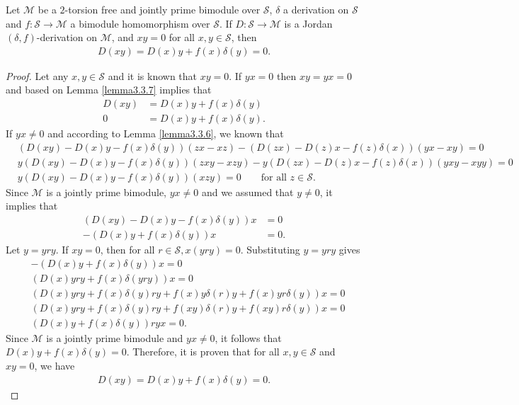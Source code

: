 \documentclass{arxiv}
\begin{document}
\begin{lemma}\label{lemma3.3.8}
    Let $\mathcal{M}$ be a $2$-torsion free and jointly prime bimodule over $\mathcal{S}$, $\delta$ a derivation on $\mathcal{S}$ and $f : \mathcal{S} \rightarrow \mathcal{M}$ a bimodule homomorphism over $\mathcal{S}$. If $D:\mathcal{S} \rightarrow \mathcal{M}$ is a Jordan $(\delta,f)$-derivation on $\mathcal{M}$, and $xy=0$ for all $x,y \in \mathcal{S}$, then
    \begin{align*}
        D(xy) = D(x)y + f(x)\delta (y)=0.
    \end{align*}
\end{lemma}
\begin{proof}
     Let any $x,y \in \mathcal{S}$ and it is known that $xy = 0$. If $yx = 0$ then $xy=yx = 0$ and based on Lemma \ref{lemma3.3.7} implies that 
     \begin{align*}
         D(xy) & =D(x)y + f(x)\delta (y)\\
        0 &= D(x)y + f(x)\delta (y).
     \end{align*}
     If $yx \ne 0$ and according to Lemma \ref{lemma3.3.6}, we known that
     \begin{align*}
         &(D(xy)-D(x)y-f(x)\delta(y))(zx-xz) - (D(zx)-D(z)x-f(z)\delta (x)) (yx-xy)=0\\
         &y(D(xy)-D(x)y-f(x)\delta (y))(zxy-xzy) - y(D(zx)-D(z)x-f(z)\delta (x))(yxy-xyy)=0\\
         &y(D(xy)-D(x)y-f(x)\delta(y))(xzy)=0 \quad \quad \text{for all } z \in \mathcal{S}.
     \end{align*}
     Since $\mathcal{M}$ is a jointly prime bimodule, $yx \ne 0$ and we assumed that $y \ne 0$, it implies that
     \begin{align*}
         (D(xy)-D(x)y-f(x)\delta (y))x &= 0\\
          -(D(x)y+f(x)\delta (y))x &= 0.
     \end{align*}
     Let $y = yry$. If $xy = 0$, then for all $r \in \mathcal{S}, x(yry)=0$. Substituting $y = yry$ gives
     \begin{align*}
          &-(D(x)y+f(x)\delta (y))x=0\\
          &(D(x)yry+f(x)\delta (yry))x = 0\\
          & (D(x)yry + f(x)\delta (y)ry+f(x)y\delta (r)y + f(x)yr\delta (y))x = 0\\
          &(D(x)yry+f(x)\delta(y)ry+f(xy)\delta (r)y+f(xy)r \delta(y))x = 0\\
          &(D(x)y+f(x)\delta(y))ryx = 0.
     \end{align*}
     Since $\mathcal{M}$ is a jointly prime bimodule and $yx \ne 0$, it follows that $D(x)y + f(x)\delta (y) = 0$. Therefore, it is proven that for all $x,y \in \mathcal{S}$ and $xy=0$, we have
     \begin{align*}
         D(xy)=D(x)y+ f(x)\delta (y)=0.
     \end{align*}
\end{proof}
\end{document}
